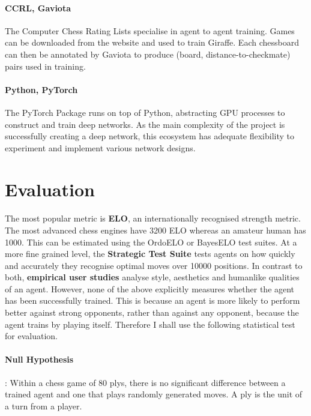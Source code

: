 \documentclass[a4paper]{article}
\begin{document}
\paragraph{CCRL, Gaviota} The Computer Chess Rating Lists specialise in agent to agent training. Games can be downloaded from the website and used to train Giraffe. Each chessboard can then be annotated by Gaviota to produce (board, distance-to-checkmate) pairs used in training. \cite{gaviota} \cite{giraffe}

\paragraph{Python, PyTorch} The PyTorch Package runs on top of Python, abstracting GPU processes to construct and train deep networks. As the main complexity of the project is successfully creating a deep network, this ecosystem has adequate flexibility to experiment and implement various network designs. \cite{PyTorch} 


\section*{Evaluation}

\paragraph{} The most popular metric is \textbf{ELO}, an internationally recognised strength metric. The most advanced chess engines have 3200 ELO whereas an amateur human has 1000. \cite{giraffe} This can be estimated using the OrdoELO or BayesELO test suites. At a more fine grained level, the \textbf{Strategic Test Suite} tests agents on how quickly and accurately they recognise optimal moves over 10000 positions. \cite{sts} In contrast to both, \textbf{empirical user studies} analyse style, aesthetics and humanlike qualities of an agent. However, none of the above explicitly measures whether the agent has been successfully trained. This is because an agent is more likely to perform better against strong opponents, rather than against any opponent, because the agent trains by playing itself. Therefore I shall use the following statistical test for evaluation.

\paragraph{Null Hypothesis}: Within a chess game of 80 plys, there is no significant difference between a trained agent and one that plays randomly generated moves. A ply is the unit of a turn from a player.
\end{document}
